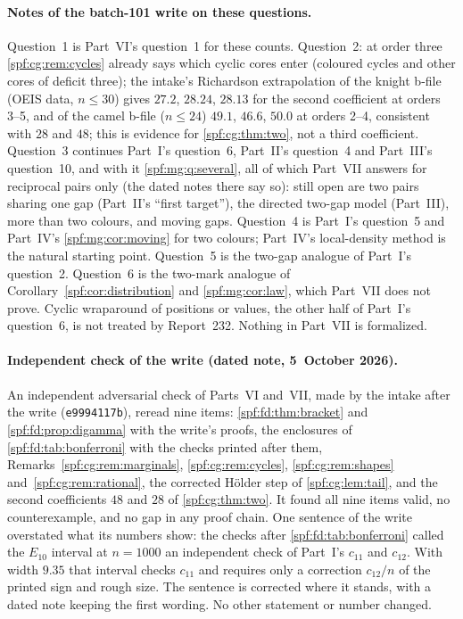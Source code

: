 \documentclass[11pt]{article}
\numberwithin{equation}{section}
\theoremstyle{definition}
\theoremstyle{remark}
\theoremstyle{definition}
\begin{document}
\paragraph{Notes of the batch-101 write on these questions.}
Question~1 is Part~VI's question~1 for these counts. Question~2: at order
three \cref{spf:cg:rem:cycles} already says which cyclic cores enter
(coloured cycles and other cores of deficit three); the intake's
Richardson extrapolation of the knight b-file (OEIS data, $n\le30$) gives
$27.2$, $28.24$, $28.13$ for the second coefficient at orders 3--5, and of
the camel b-file ($n\le24$) $49.1$, $46.6$, $50.0$ at orders 2--4, consistent
with $28$ and $48$; this is evidence for \cref{spf:cg:thm:two}, not a third
coefficient. Question~3 continues Part~I's question~6, Part~II's question~4
and Part~III's question~10, and with it \cref{spf:mg:q:several}, all of which
Part~VII answers for reciprocal pairs only (the dated notes there say so):
still open are two pairs sharing one gap (Part~II's ``first target''), the
directed two-gap model (Part~III), more than two colours, and moving gaps.
Question~4 is Part~I's question~5 and Part~IV's \cref{spf:mg:cor:moving} for
two colours; Part~IV's local-density method is the natural starting point.
Question~5 is the two-gap analogue of Part~I's question~2. Question~6 is the
two-mark analogue of Corollary~\ref{spf:cor:distribution} and
\cref{spf:mg:cor:law}, which Part~VII does not prove. Cyclic wraparound of
positions or values, the other half of Part~I's question~6, is not treated
by Report~232. Nothing in Part~VII is formalized.

\paragraph{Independent check of the write (dated note, 5~October 2026).}
An independent adversarial check of Parts~VI and~VII, made by the intake
after the write (\texttt{e9994117b}), reread nine items:
\cref{spf:fd:thm:bracket} and \cref{spf:fd:prop:digamma} with the write's
proofs, the enclosures of \cref{spf:fd:tab:bonferroni} with the checks
printed after them, Remarks~\ref{spf:cg:rem:marginals},
\ref{spf:cg:rem:cycles}, \ref{spf:cg:rem:shapes}
and~\ref{spf:cg:rem:rational}, the corrected H\"older step of
\cref{spf:cg:lem:tail}, and the second coefficients $48$ and $28$ of
\cref{spf:cg:thm:two}. It found all nine items valid, no counterexample,
and no gap in any proof chain. One sentence of the write overstated what
its numbers show: the checks after \cref{spf:fd:tab:bonferroni} called the
$E_{10}$ interval at $n=1000$ an independent check of Part~I's $c_{11}$
and $c_{12}$. With width $9.35$ that interval checks $c_{11}$ and requires
only a correction $c_{12}/n$ of the printed sign and rough size. The
sentence is corrected where it stands, with a dated note keeping the first
wording. No other statement or number changed.
\end{document}

